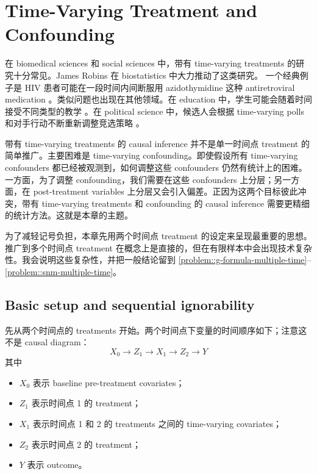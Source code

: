  
\chapter{Time-Varying Treatment and Confounding}
 \label{chapter::timevarying}
 

在 biomedical sciences 和 social sciences 中，带有 time-varying treatments 的研究十分常见。James Robins 在 biostatistics 中大力推动了这类研究。
一个经典例子是 HIV 患者可能在一段时间内间断服用 azidothymidine 这种 antiretroviral medication \citep{robins2000marginal, hernan2000marginal}。类似问题也出现在其他领域。在 education 中，学生可能会随着时间接受不同类型的教学 \citep{hong2008causal}。在 political science 中，候选人会根据 time-varying polls 和对手行动不断重新调整竞选策略 \citep{blackwell2013framework}。


带有 time-varying treatments 的 causal inference 并不是单一时间点 treatment 的简单推广。主要困难是 time-varying confounding。即使假设所有 time-varying confounders 都已经被观测到，如何调整这些 confounders 仍然有统计上的困难。一方面，为了调整 confounding，我们需要在这些 confounders 上分层；另一方面，在 post-treatment variables 上分层又会引入偏差。正因为这两个目标彼此冲突，带有 time-varying treatments 和 confounding 的 causal inference 需要更精细的统计方法。这就是本章的主题。

 


为了减轻记号负担，本章先用两个时间点 treatment 的设定来呈现最重要的思想。推广到多个时间点 treatment 在概念上是直接的，但在有限样本中会出现技术复杂性。我会说明这些复杂性，并把一般结论留到 \cref{problem::g-formula-multiple-time}--\cref{problem::snm-multiple-time}。



\section{Basic setup and sequential ignorability}


先从两个时间点的 treatments 开始。两个时间点下变量的时间顺序如下；注意这不是 causal diagram：
$$
X_0 \rightarrow Z_1 \rightarrow X_1 \rightarrow Z_2 \rightarrow Y 
$$
其中
\begin{itemize}
\item
$X_0$ 表示 baseline pre-treatment covariates；
\item
$Z_1$ 表示时间点 1 的 treatment；
\item
$X_1$ 表示时间点 1 和 2 的 treatments 之间的 time-varying covariates；
\item
$Z_2$ 表示时间点 2 的 treatment；
\item
$Y$ 表示 outcome。
\end{itemize}


